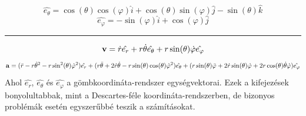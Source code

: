 \documentclass[../main.tex]{subfiles}
\begin{document}
\begin{equation}
     \hat{e_\theta} = \cos(\theta)\cos(\varphi)\hat{i} + \cos(\theta)\sin(\varphi)\hat{j} - \sin(\theta)\hat{k}
\end{equation}
\begin{equation}
    \hat{e_\varphi} = -\sin(\varphi)\hat{i} + \cos(\varphi)\hat{j}
\end{equation}
\noindent\hfil\rule{0.5\textwidth}{.4pt}\hfil
\begin{equation}
    \bold{v} = \dot{r}\hat{e_r} + r\dot{\theta}\hat{e_\theta} + r\sin(\theta)\dot{\varphi}\hat{e_\varphi}
\end{equation}
\begin{equation}
    \bold{a} = (\ddot{r} - r\dot{\theta}^2 - r\sin^2(\theta)\dot{\varphi}^2)\hat{e_r} + (r\ddot{\theta} + 2\dot{r}\dot{\theta} - r\sin(\theta)\cos(\theta)\dot{\varphi}^2)\hat{e_\theta} + (r\sin(\theta)\ddot{\varphi} + 2\dot{r}\sin(\theta)\dot{\varphi} + 2r\cos(\theta)\dot{\theta}\dot{\varphi})\hat{e_\varphi}
\end{equation}
Ahol $\hat{e_r}$, $\hat{e_\theta}$ és $\hat{e_\varphi}$ a gömbkoordináta-rendszer egységvektorai. Ezek a kifejezések bonyolultabbak, mint a Descartes-féle koordináta-rendszerben, de bizonyos problémák esetén egyszerűbbé teszik a számításokat.
\end{document}
